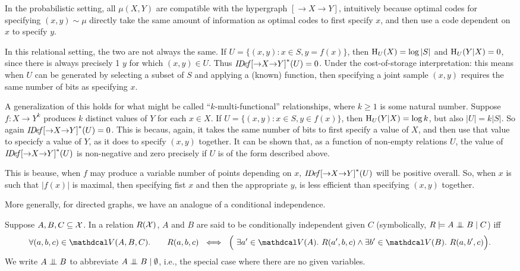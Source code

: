 \begin{example}
    In the probabilistic setting, all $\mu(X,Y)$ are compatible with the hypergraph $[{\to} X {\to}Y]$, intuitively because optimal codes for specifying $(x,y) \sim \mu$ directly take the same amount of information as optimal codes to first specify $x$, and then use a code dependent on $x$ to specify $y$. 
    
    In this relational setting, the two are not always the same.
         If $U = \{(x,y) : x \in S, y = f(x) \}$, then
        $\operatorname{\mathrm{H}}_U(X) = \log |S|$ and
        $\operatorname{\mathrm{H}}_U(Y|X) = 0$, since there is always precisely 1 $y$ for which $(x,y) \in U$. Thus $\mathit{I\mskip-3.0muD\mskip-2.5mue\mskip-1.5muf}{[{\to}X{\to}Y]}^*(U) = 0$. 
        Under the cost-of-storage interpretation: this means when $U$ can be generated by selecting a subset of $S$ and applying a (known) function, then specifying a joint sample $(x,y)$ requires the same number of bits as specifying $x$.
        
    A generalization of this holds for what might be called ``$k$-multi-functional'' relationships, where $k \ge 1$ is some natural number. Suppose $f: X \to Y^k$ produces $k$ distinct values of $Y$ for each $x \in X$. 
    If $U = \{ (x,y) : x \in S, y \in f(x) \}$, then $\operatorname{\mathrm{H}}_U(Y|X) = \log k$, but also $|U| = k |S|$. 
    So again $\mathit{I\mskip-3.0muD\mskip-2.5mue\mskip-1.5muf}{[{\to}X{\to}Y]}^*(U) = 0$.
    This is becaus, again, it takes the same number of bits to first specify a value of $X$, and then use that value to specicfy a value of $Y$, as it does to specify $(x,y)$ together. 
    It can be shown that, as a function of non-empty relations $U$, the value of $\mathit{I\mskip-3.0muD\mskip-2.5mue\mskip-1.5muf}{[{\to}X{\to}Y]}^*(U)$ is non-negative and zero precisely if $U$ is of the form described above. 
    
    This is beause, when $f$ may produce a variable number of points depending on $x$, $\mathit{I\mskip-3.0muD\mskip-2.5mue\mskip-1.5muf}{[{\to}X{\to}Y]}^*(U)$ will be positive overall. So, when $x$ is such that $|f(x)|$ is maximal, then specifying fist $x$ and then the appropriate $y$, is less efficient than specifying $(x,y)$ together. 
\end{example}

More generally, for directed graphs, we have an analogue of a conditional independence.

\begin{defn}
    Suppose $A,B,C \subseteq \mathcal X$. In a relation $R(\mathcal X)$, $A$ and $B$ are said to be conditionally independent given $C$ 
    (symbolically, $R \models A \mathrel{\perp\mspace{-10mu}\perp} B \mid C$)
    iff 
    \[
    \forall (a,b,c) \in \V(A,B,C).\qquad
    R(a,b,c) ~\iff~ \Big(~\exists a' \in \V (A).~ R(a',b,c) \land \exists b' \in \V (B).~R(a,b',c) \Big)
    .
    \]
    We write $A \mathrel{\perp\mspace{-10mu}\perp} B$ to abbreviate $A \mathrel{\perp\mspace{-10mu}\perp} B \mid \emptyset$, i.e., the special case where there are no given variables.
\end{defn}

